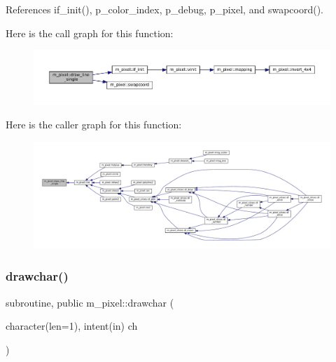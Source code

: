 References if\+\_\+init(), p\+\_\+color\+\_\+index, p\+\_\+debug, p\+\_\+pixel, and swapcoord().

Here is the call graph for this function\+:
\nopagebreak
\begin{figure}[H]
\begin{center}
\leavevmode
\includegraphics[width=350pt]{namespacem__pixel_a42791c7e58158616dae7c36ec5806717_cgraph}
\end{center}
\end{figure}
Here is the caller graph for this function\+:
\nopagebreak
\begin{figure}[H]
\begin{center}
\leavevmode
\includegraphics[width=350pt]{namespacem__pixel_a42791c7e58158616dae7c36ec5806717_icgraph}
\end{center}
\end{figure}
\mbox{\label{namespacem__pixel_a58406ffd6c2a9fdf2ea7772198b54255}} 
\subsubsection{\texorpdfstring{drawchar()}{drawchar()}}
{\footnotesize\ttfamily subroutine, public m\+\_\+pixel\+::drawchar (\begin{DoxyParamCaption}\item[{character(len=1), intent(in)}]{ch }\end{DoxyParamCaption})}

\mbox{\label{namespacem__pixel_a3f8850328e359af5802954b2f70652f5}} 
